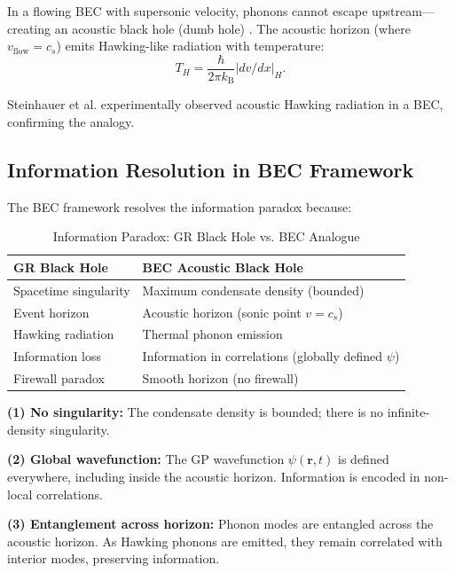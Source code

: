 \documentclass[11pt,a4paper]{article}
\newcommand{\kB}{\ensuremath{k_{\mathrm{B}}}}
\newcommand{\cs}{\ensuremath{c_s}}
\theoremstyle{definition}
\theoremstyle{remark}
\begin{document}
In a flowing BEC with supersonic velocity, phonons cannot escape upstream---creating an acoustic black hole (dumb hole) \cite{Unruh1981,Barcelo2005}. The acoustic horizon (where $v_{\mathrm{flow}} = \cs$) emits Hawking-like radiation with temperature:
\begin{equation}
T_H = \frac{\hbar}{2\pi \kB}|dv/dx|_H.
\end{equation}

Steinhauer et al. \cite{Steinhauer2016} experimentally observed acoustic Hawking radiation in a BEC, confirming the analogy.

\subsection{Information Resolution in BEC Framework}
\label{sec:info_resolution}

The BEC framework resolves the information paradox because:

\begin{table}[H]
\centering
\caption{Information Paradox: GR Black Hole vs. BEC Analogue}
\label{tab:info_paradox}
\begin{tabular}{@{}ll@{}}
\toprule
\textbf{GR Black Hole} & \textbf{BEC Acoustic Black Hole} \\
\midrule
Spacetime singularity & Maximum condensate density (bounded) \\
Event horizon & Acoustic horizon (sonic point $v = \cs$) \\
Hawking radiation & Thermal phonon emission \\
Information loss & Information in correlations (globally defined $\psi$) \\
Firewall paradox & Smooth horizon (no firewall) \\
\bottomrule
\end{tabular}
\end{table}

\textbf{(1) No singularity:} The condensate density is bounded; there is no infinite-density singularity.

\textbf{(2) Global wavefunction:} The GP wavefunction $\psi(\mathbf{r},t)$ is defined everywhere, including inside the acoustic horizon. Information is encoded in non-local correlations.

\textbf{(3) Entanglement across horizon:} Phonon modes are entangled across the acoustic horizon. As Hawking phonons are emitted, they remain correlated with interior modes, preserving information.
\end{document}
